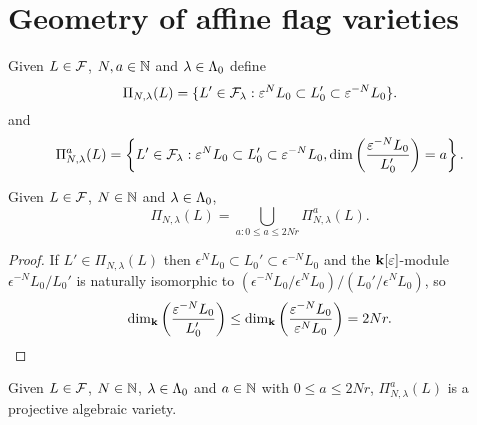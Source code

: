 \documentclass[a4paper, 11pt]{report}
\begin{document}
\section{Geometry of affine flag varieties}

Given $L\in\mathcal{F}$, $N,a\in\mathbb{N}$ and $\lambda\in{\Lambda_0}$ define
\begin{equation*}
\Pi_{N,\lambda}(L) = \{L'\in\mathcal{F}_\lambda: \varepsilon^N L_0\subset L_0'\subset \varepsilon^{-N}L_0\}.
\end{equation*}
and
\begin{equation*}
\Pi_{N,\lambda}^a(L) = \left\{L'\in\mathcal{F}_\lambda: \varepsilon^N L_0\subset L_0'\subset \varepsilon^{-N}L_0, \dim\left(\frac{\varepsilon^{-N}L_0}{L_0'}\right) = a\right\}.
\end{equation*}

\begin{lemma}
Given $L\in\mathcal{F}$, $N\in\mathbb{N}$ and $\lambda\in{\Lambda_0}$,
\begin{equation*}
\Pi_{N,\lambda}(L) = \bigcup_{a:0\le a\le 2Nr} \Pi_{N,\lambda}^a(L).
\end{equation*}
\end{lemma}

\begin{proof}
If $L'\in\Pi_{N,\lambda}(L)$ then $\epsilon^N L_0\subset L_0'\subset\epsilon^{-N} L_0$ and the $\mathbf{k}[\varepsilon]$-module $\epsilon^{-N} L_0/{L_0'}$ is naturally isomorphic to $(\epsilon^{-N}L_0/{\epsilon^N L_0})/{(L_0'/{\epsilon^N L_0})}$, so
\begin{equation*}
\dim_{\mathbf{k}}\left(\frac{\varepsilon^{-N}L_0}{L_0'}\right) \le \dim_{\mathbf{k}}\left(\frac{\varepsilon^{-N}L_0}{\varepsilon^N L_0}\right) = 2Nr.
\end{equation*}
\end{proof}

\begin{lemma}\label{lemma:projective-varieties-of-cyclic-flags}
Given $L\in\mathcal{F}$, $N\in\mathbb{N}$, $\lambda\in{\Lambda_0}$ and $a\in\mathbb{N}$ with $0\le a\le 2Nr$, $\Pi_{N,\lambda}^a(L)$ is a projective algebraic variety.
\end{lemma}
\end{document}
